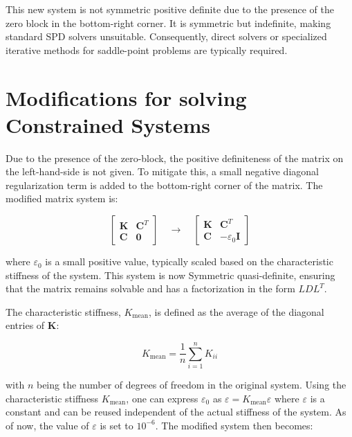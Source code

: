 This new system is not symmetric positive definite due to the presence of the zero block in the bottom-right corner.
It is symmetric but indefinite, making standard SPD solvers unsuitable.
Consequently, direct solvers or specialized iterative methods for saddle-point problems are typically required.

\section{Modifications for solving Constrained Systems}

Due to the presence of the zero-block, the positive definiteness of the matrix on the left-hand-side is not given.
To mitigate this, a small negative diagonal regularization term is added to the bottom-right corner of the matrix. The modified matrix system is:

\begin{equation}
\begin{bmatrix}
\mathbf{K} & \mathbf{C}^T \\
\mathbf{C} & \mathbf{0}
\end{bmatrix}
\quad \longrightarrow \quad
\begin{bmatrix}
\mathbf{K} & \mathbf{C}^T \\
\mathbf{C} & -\varepsilon_0 \mathbf{I}
\end{bmatrix}
\end{equation}

where \(\varepsilon_0\) is a small positive value, typically scaled based on the characteristic stiffness of the system.
This system is now Symmetric quasi-definite, ensuring that the matrix remains solvable and has a factorization in the form $LDL^T$. \textcite{Vanderbei1995}


The characteristic stiffness, \( K_{\text{mean}} \), is defined as the average of the diagonal entries of \(\mathbf{K}\):

\begin{equation}
K_{\text{mean}} = \frac{1}{n} \sum_{i=1}^{n} K_{ii}
\end{equation}

with \( n \) being the number of degrees of freedom in the original system. Using the characteristic stiffness $K_{\text{mean}}$, one can express
\(\varepsilon_0\) as \(\varepsilon = K_{\text{mean}} \varepsilon\) where \(\varepsilon\) is a constant
and can be reused independent of the actual stiffness of the system. As of now, the value of \(\varepsilon\) is set to \(10^{-6}\).
The modified system then becomes:

